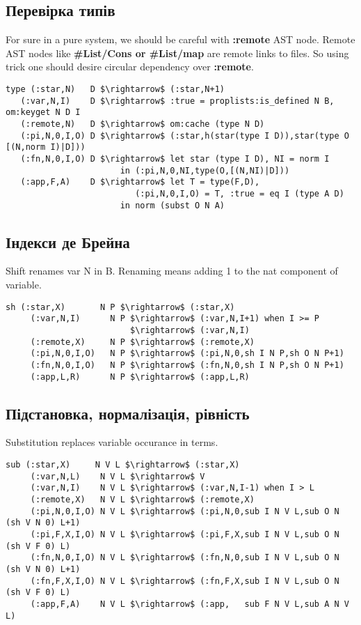 \begin{definition}
\begin{definition}
\begin{definition}
\begin{definition}
\subsection{Перевірка типів}

For sure in a pure system, we should be careful with {\bf :remote} AST node.
Remote AST nodes like {\bf \#List/Cons or \#List/map} are remote links to files.
So using trick one should desire circular dependency over {\bf :remote}.

\begin{lstlisting}[mathescape=true]
type (:star,N)   D $\rightarrow$ (:star,N+1)
   (:var,N,I)    D $\rightarrow$ :true = proplists:is_defined N B, om:keyget N D I
   (:remote,N)   D $\rightarrow$ om:cache (type N D)
   (:pi,N,0,I,O) D $\rightarrow$ (:star,h(star(type I D)),star(type O [(N,norm I)|D]))
   (:fn,N,0,I,O) D $\rightarrow$ let star (type I D), NI = norm I
                       in (:pi,N,0,NI,type(O,[(N,NI)|D]))
   (:app,F,A)    D $\rightarrow$ let T = type(F,D),
                          (:pi,N,0,I,O) = T, :true = eq I (type A D)
                       in norm (subst O N A)
\end{lstlisting}

\subsection{Індекси де Брейна}

Shift renames var N in B. Renaming means adding 1 to the nat component of variable.

\begin{lstlisting}[mathescape=true]
  sh (:star,X)       N P $\rightarrow$ (:star,X)
     (:var,N,I)      N P $\rightarrow$ (:var,N,I+1) when I >= P
                         $\rightarrow$ (:var,N,I)
     (:remote,X)     N P $\rightarrow$ (:remote,X)
     (:pi,N,0,I,O)   N P $\rightarrow$ (:pi,N,0,sh I N P,sh O N P+1)
     (:fn,N,0,I,O)   N P $\rightarrow$ (:fn,N,0,sh I N P,sh O N P+1)
     (:app,L,R)      N P $\rightarrow$ (:app,L,R)
\end{lstlisting}

\subsection{Підстановка, нормалізація, рівність}
Substitution replaces variable occurance in terms.

\begin{lstlisting}[mathescape=true]
 sub (:star,X)     N V L $\rightarrow$ (:star,X)
     (:var,N,L)    N V L $\rightarrow$ V
     (:var,N,I)    N V L $\rightarrow$ (:var,N,I-1) when I > L
     (:remote,X)   N V L $\rightarrow$ (:remote,X)
     (:pi,N,0,I,O) N V L $\rightarrow$ (:pi,N,0,sub I N V L,sub O N (sh V N 0) L+1)
     (:pi,F,X,I,O) N V L $\rightarrow$ (:pi,F,X,sub I N V L,sub O N (sh V F 0) L)
     (:fn,N,0,I,O) N V L $\rightarrow$ (:fn,N,0,sub I N V L,sub O N (sh V N 0) L+1)
     (:fn,F,X,I,O) N V L $\rightarrow$ (:fn,F,X,sub I N V L,sub O N (sh V F 0) L)
     (:app,F,A)    N V L $\rightarrow$ (:app,   sub F N V L,sub A N V L)
\end{lstlisting}


\end{definition}
\end{definition}
\end{definition}
\end{definition}
